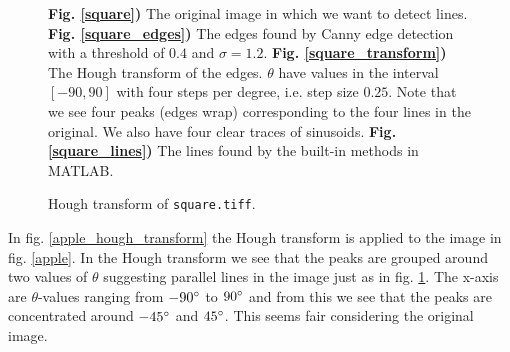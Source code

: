 \documentclass[a4paper, 10pt, final]{article}
\begin{document}
\begin{figure}[!h]
    \caption[]{\textbf{Fig. \ref{square})} The original image in which
    we want to detect lines.
    \textbf{Fig. \ref{square_edges})} The edges found by Canny edge
    detection with a threshold of $0.4$ and $\sigma = 1.2$.
    \textbf{Fig. \ref{square_transform})} The Hough transform of the
    edges. $\theta$ have values in the interval $[-90,90]$ with four
    steps per degree, i.e. step size $0.25$. Note that we see four peaks
    (edges wrap) corresponding to the four lines in the original. We
    also have four clear traces of sinusoids.
    \textbf{Fig. \ref{square_lines})} The lines found by the built-in
    methods in MATLAB.
    }
    \caption{Hough transform of \texttt{square.tiff}.}
    \label{square_hough_transform}
\end{figure}

In fig. \ref{apple_hough_transform} the Hough transform is applied to
the image in fig. \ref{apple}. In the Hough transform we see that the
peaks are grouped around two values of $\theta$ suggesting parallel
lines in the image just as in fig. \ref{square_hough_transform}. The
x-axis are $\theta$-values ranging from $-90^\circ$ to $90^\circ$ and
from this we see that the peaks are concentrated around $-45^\circ$ and
$45^\circ$. This seems fair considering the original image.
\end{document}
